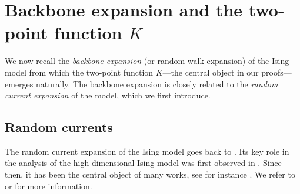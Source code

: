 \documentclass[11pt,a4paper]{article}
\numberwithin{equation}{section}
\theoremstyle{plain}
\theoremstyle{definition}
\begin{document}
\section{Backbone expansion and the two-point function $K$}\label{sec:backbone and stuff}

We now recall the \emph{backbone expansion} (or random walk expansion) of the Ising model from which the two-point function $K$---the central object in our proofs---emerges naturally. The backbone expansion is closely related to the \emph{random current expansion} of the model, which we first introduce.
\subsection{Random currents}
%
The random current expansion of the Ising model goes back to \cite{GriffithsHurstShermanConcavity1970}. Its key role in the analysis of the high-dimensional Ising model was first observed in \cite{AizenmanGeometricAnalysis1982}.  Since then, it has been the central object of many works, see for instance \cite{AizenmanGrahamRenormalizedCouplingSusceptibility4d1983,AizenmanFernandezCriticalBehaviorMagnetization1986,AizenmanBarskyFernandezSharpnessIsing1987,AizenmanDuminilSidoraviciusContinuityIsing2015,DuminilTassionNewProofSharpness2016,AizenmanDuminilTassionWarzelEmergentPlanarity2019,AizenmanDuminilTriviality2021,PanisTriviality2023,KrachunPanagiotisPanisScalinglimit2023,chen2023conformal,PanisIIC2024,DuminilPanis2024newLB,duminil2025conformal,LiuPanisSladePlateau,thinggaard2026end,hansen2026supercritical}. We refer to \cite{DuminilLecturesOnIsingandPottsModels2019} or \cite[Chapter~2]{Panis2024applications} for more information.
\end{document}
